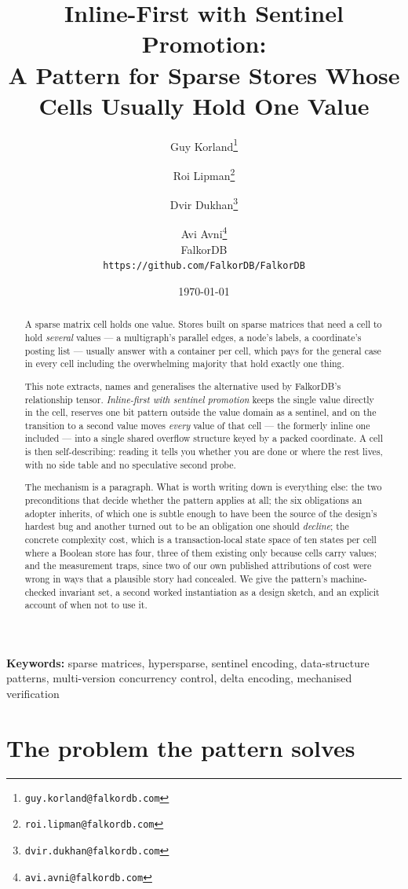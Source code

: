 \documentclass[11pt,a4paper]{article}
\title{\textbf{Inline-First with Sentinel Promotion:\\
A Pattern for Sparse Stores Whose Cells Usually Hold One Value}}
\author{%
Guy Korland\thanks{\texttt{guy.korland@falkordb.com}} \and
Roi Lipman\thanks{\texttt{roi.lipman@falkordb.com}} \and
Dvir Dukhan\thanks{\texttt{dvir.dukhan@falkordb.com}} \and
Avi Avni\thanks{\texttt{avi.avni@falkordb.com}}
\\[0.6em]
FalkorDB\\
\small\texttt{https://github.com/FalkorDB/FalkorDB}}
\date{\today}
\theoremstyle{plain}
\theoremstyle{definition}
\theoremstyle{remark}
\begin{document}
\maketitle

\begin{abstract}
A sparse matrix cell holds one value. Stores built on sparse matrices that need
a cell to hold \emph{several} values --- a multigraph's parallel edges, a
node's labels, a coordinate's posting list --- usually answer with a container
per cell, which pays for the general case in every cell including the
overwhelming majority that hold exactly one thing.

This note extracts, names and generalises the alternative used by FalkorDB's
relationship tensor. \emph{Inline-first with sentinel promotion} keeps the
single value directly in the cell, reserves one bit pattern outside the value
domain as a sentinel, and on the transition to a second value moves
\emph{every} value of that cell --- the formerly inline one included --- into a
single shared overflow structure keyed by a packed coordinate. A cell is then
self-describing: reading it tells you whether you are done or where the rest
lives, with no side table and no speculative second probe.

The mechanism is a paragraph. What is worth writing down is everything else:
the two preconditions that decide whether the pattern applies at all; the six
obligations an adopter inherits, of which one is subtle enough to have been the
source of the design's hardest bug and another turned out to be an obligation
one should \emph{decline}; the concrete complexity cost, which is a
transaction-local state space of ten states per cell where a Boolean store has
four, three of them existing only because cells carry values; and the
measurement traps, since two of our own published attributions of cost were
wrong in ways that a plausible story had concealed. We give the pattern's
machine-checked invariant set, a second worked instantiation as a design
sketch, and an explicit account of when not to use it.
\end{abstract}

\noindent\textbf{Keywords:} sparse matrices, hypersparse, sentinel encoding,
data-structure patterns, multi-version concurrency control, delta encoding,
mechanised verification

\section{The problem the pattern solves}
\end{document}
